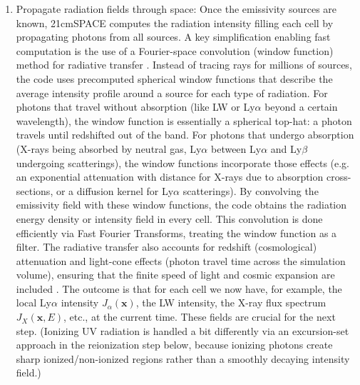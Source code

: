 \documentclass[floats,floatfix,showpacs,amssymb,prd,superscriptaddress,nofootinbib]{revtex4-2} %
\begin{document}
\begin{enumerate}
    \item Propagate radiation fields through space: Once the emissivity sources are known, 21cmSPACE computes the radiation intensity filling each cell by propagating photons from all sources. A key simplification enabling fast computation is the use of a Fourier-space convolution (window function) method for radiative transfer \citep{gessey-jones_2024}. Instead of tracing rays for millions of sources, the code uses precomputed spherical window functions that describe the average intensity profile around a source for each type of radiation. For photons that travel without absorption (like LW or Ly$\alpha$ beyond a certain wavelength), the window function is essentially a spherical top-hat: a photon travels until redshifted out of the band. For photons that undergo absorption (X-rays being absorbed by neutral gas, Ly$\alpha$ between Ly$\alpha$ and Ly$\beta$ undergoing scatterings), the window functions incorporate those effects (e.g. an exponential attenuation with distance for X-rays due to absorption cross-sections, or a diffusion kernel for Ly$\alpha$ scatterings). By convolving the emissivity field with these window functions, the code obtains the radiation energy density or intensity field in every cell. This convolution is done efficiently via Fast Fourier Transforms, treating the window function as a filter. The radiative transfer also accounts for redshift (cosmological) attenuation and light-cone effects (photon travel time across the simulation volume), ensuring that the finite speed of light and cosmic expansion are included \citep{gessey-jones_2024}. The outcome is that for each cell we now have, for example, the local Ly$\alpha$ intensity $J_{\alpha}(\mathbf{x})$, the LW intensity, the X-ray flux spectrum $J_X(\mathbf{x},E)$, etc., at the current time. These fields are crucial for the next step. (Ionizing UV radiation is handled a bit differently via an excursion-set approach in the reionization step below, because ionizing photons create sharp ionized/non-ionized regions rather than a smoothly decaying intensity field.)


\end{enumerate}
\end{document}
